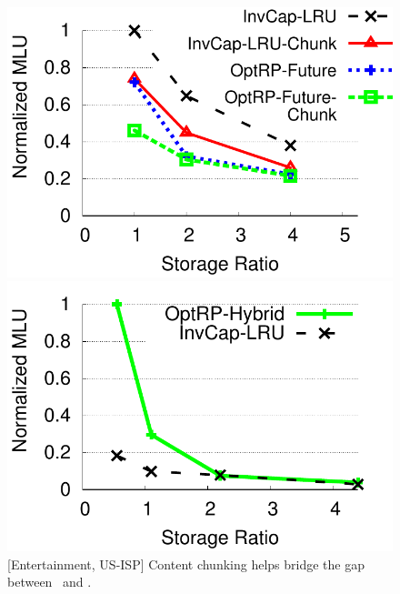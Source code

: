 \begin{figure}
\begin{minipage}[b]{0.31\linewidth}
\begin{center}
\includegraphics[width=\textwidth]{graphSet1/chunkcomp/ATTVideos.pdf}
\end{center}
\vspace{-0.25in}
\caption{[Entertainment, US-ISP] Content chunking helps bridge the gap between \invlru\ and \optrpfuture.}
\label{fig:chunking}
\end{minipage}
\vspace{-0.15in}
\hspace{0.2cm}
\begin{minipage}[b]{0.31\linewidth}
\begin{center}
\includegraphics[width=\textwidth]{graphSet1/hybrid/AbileneVideos.pdf}

\end{center}
\end{minipage}
\end{figure}
